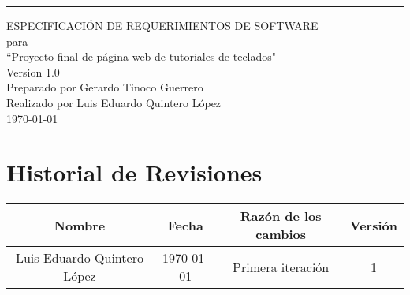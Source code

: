 \documentclass{scrreprt}
\def\myversion{1.0 }
\begin{document}
	\begin{flushright}
		\rule{16cm}{5pt}\vskip1cm
		\begin{bfseries}
			\huge{ESPECIFICACIÓN DE REQUERIMIENTOS DE SOFTWARE}\\
			\vspace{1.9cm}
			para\\
			\vspace{1.9cm}
			``Proyecto final de página web de tutoriales de teclados"\\
			\vspace{1.9cm}
			\LARGE{Version \myversion}\\
			\vspace{1.9cm}
			Preparado por Gerardo Tinoco Guerrero\\
			\vspace{1.9cm}
			Realizado por Luis Eduardo Quintero López\\
			\vspace{1.9cm}
			\today\\
		\end{bfseries}
	\end{flushright}
	
	\tableofcontents
	

	
	\chapter*{Historial de Revisiones}

		\begin{center}
			\begin{tabular}{|c|c|c|c|}
				\hline
				Nombre	&	Fecha	&	Razón de los cambios	&	Versión\\
				\hline
				Luis Eduardo Quintero López	& 	\today 	& 	Primera iteración 				& 	1\\
				\hline
			\end{tabular}
		\end{center}
		
\end{document}
